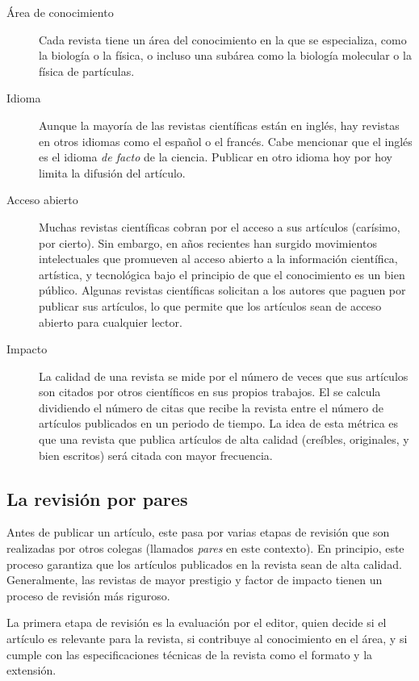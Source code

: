 \begin{description} \item[Área de conocimiento] Cada revista tiene un área del conocimiento en la que se especializa, como la biología o la física, o incluso una subárea como la biología molecular o la física de partículas.
	\item[Idioma] Aunque la mayoría de las revistas científicas están en inglés, hay revistas en otros idiomas como el español o el francés.
	      Cabe mencionar que el inglés es el idioma \emph{de facto} de la ciencia.
	      Publicar en otro idioma hoy por hoy limita la difusión del artículo.
	\item[Acceso abierto] Muchas revistas científicas cobran por el acceso a sus artículos (carísimo, por cierto).
	      Sin embargo, en años recientes han surgido movimientos intelectuales que promueven al acceso abierto a la información científica, artística, y tecnológica bajo el principio de que el conocimiento es un bien público.
	      Algunas revistas científicas solicitan a los autores que paguen por publicar sus artículos, lo que permite que los artículos sean de acceso abierto para cualquier lector.
	\item[Impacto] La calidad de una revista se mide por el número de veces que sus artículos son citados por otros científicos en sus propios trabajos.
	      El  se calcula dividiendo el número de citas que recibe la revista entre el número de artículos publicados en un periodo de tiempo.
	      La idea de esta métrica es que una revista que publica artículos de alta calidad (creíbles, originales, y bien escritos) será citada con mayor frecuencia.
\end{description}

\subsection*{La revisión por pares}
Antes de publicar un artículo, este pasa por varias etapas de revisión que son realizadas por otros colegas (llamados \emph{pares} en este contexto).
En principio, este proceso garantiza que los artículos publicados en la revista sean de alta calidad.
Generalmente, las revistas de mayor prestigio y factor de impacto tienen un proceso de revisión más riguroso.

La primera etapa de revisión es la evaluación por el editor, quien decide si el artículo es relevante para la revista, si contribuye al conocimiento en el área, y si cumple con las especificaciones técnicas de la revista como el formato y la extensión.

